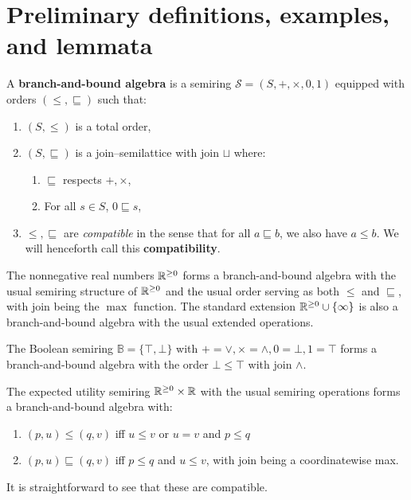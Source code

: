 \documentclass[acmsmall,review]{acmart}\settopmatter{printfolios=true,printccs=false,printacmref=false}
\begin{document}
\section{Preliminary definitions, examples, and lemmata}

\begin{definition}
  A \textbf{branch-and-bound algebra} is a semiring $\mathcal S = (S, + , \times, 0 ,1)$ equipped with orders $(\leq, \sqsubseteq)$ such that:
  \begin{enumerate}
    \item $(S, \leq)$ is a total order,
    \item $(S, \sqsubseteq)$ is a join--semilattice with join $\sqcup$ where:
      \begin{enumerate}
        \item $\sqsubseteq$ respects $+,\times$,
        \item For all $s \in S$, $0 \sqsubseteq s$, 
      \end{enumerate}
    \item $\leq, \sqsubseteq$ are \textit{compatible} in the sense that for all $a \sqsubseteq b$, we also have $a \leq b$. We will henceforth call this \textbf{compatibility}.
  \end{enumerate}
\end{definition}

\begin{example}
  The nonnegative real numbers $\mathbb{R}^{\geq 0}$ forms a branch-and-bound algebra with the usual semiring structure of $\mathbb{R}^{\geq 0}$ and the usual order serving as both $\leq$ and $\sqsubseteq$, with join being the $\max$ function. The standard extension $\mathbb{R}^{\geq 0} \cup \{\infty\}$ is also a branch-and-bound algebra with the usual extended operations.
\end{example}

\begin{example}
  The Boolean semiring $\mathbb B = \{\top, \bot\}$ with $+ = \lor, \times = \land, 0 = \bot, 1 = \top$ forms a branch-and-bound algebra with the order $\bot \leq \top$ with join $\land$. 
\end{example}


\begin{example}
  The expected utility semiring $\mathbb{R}^{\geq 0} \times \mathbb{R}$ with the usual semiring operations forms a branch-and-bound algebra with:
  \begin{enumerate}
    \item $(p,u) \leq (q,v)$ iff $u \leq v$ or $u=v$ and $p \leq q$ 
    \item $(p,u) \sqsubseteq (q,v)$ iff $p \leq q$ and $u \leq v$, with join being a coordinatewise max.
  \end{enumerate} 
  It is straightforward to see that these are compatible.
\end{example}
\end{document}
